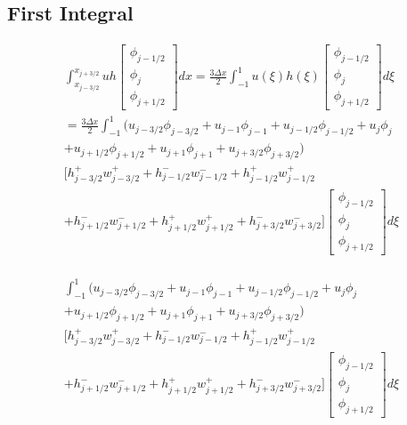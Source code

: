 \documentclass[12pt]{article}
\begin{document}
\subsection{First Integral}
\begin{multline*}
\int_{x_{j-3/2}}^{x_{j+3/2}} uh \left[\begin{array}{c}\phi_{j-1/2} \\\phi_{j}\\\phi_{j+1/2} \end{array}\right] dx = \frac{3 \Delta x}{2}\int_{-1}^{1} u(\xi)h(\xi) \left[\begin{array}{c}\phi_{j-1/2} \\\phi_{j}\\\phi_{j+1/2} \end{array}\right] d\xi \\= \frac{3 \Delta x}{2}\int_{-1}^{1} \bigg(u_{j - 3/2}\phi_{j - 3/2} + u_{j - 1}\phi_{j - 1} + u_{j - 1/2}\phi_{j - 1/2} + u_{j}\phi_{j }\\ + u_{j + 1/2}\phi_{j + 1/2} + u_{j + 1}\phi_{j + 1} + u_{j + 3/2}\phi_{j + 3/2}\bigg)\\\bigg[h^+_{j - 3/2}w^+_{j - 3/2} + h^-_{j - 1/2}w^-_{j - 1/2} + h^+_{j - 1/2}w^+_{j - 1/2} \\+ h^-_{j + 1/2}w^-_{j + 1/2} + h^+_{j + 1/2}w^+_{j + 1/2} + h^-_{j + 3/2}w^-_{j + 3/2} \bigg] \left[\begin{array}{c}\phi_{j-1/2} \\\phi_{j}\\\phi_{j+1/2} \end{array}\right] d\xi\\ 
\end{multline*}


\begin{multline*}
\int_{-1}^{1} \bigg(u_{j - 3/2}\phi_{j - 3/2} + u_{j - 1}\phi_{j - 1} + u_{j - 1/2}\phi_{j - 1/2} + u_{j}\phi_{j }\\ + u_{j + 1/2}\phi_{j + 1/2} + u_{j + 1}\phi_{j + 1} + u_{j + 3/2}\phi_{j + 3/2}\bigg)\\\bigg[h^+_{j - 3/2}w^+_{j - 3/2} + h^-_{j - 1/2}w^-_{j - 1/2} + h^+_{j - 1/2}w^+_{j - 1/2} \\+ h^-_{j + 1/2}w^-_{j + 1/2} + h^+_{j + 1/2}w^+_{j + 1/2} + h^-_{j + 3/2}w^-_{j + 3/2} \bigg] \left[\begin{array}{c}\phi_{j-1/2} \\\phi_{j}\\\phi_{j+1/2} \end{array}\right] d\xi\\ 
\end{multline*}
\end{document}
